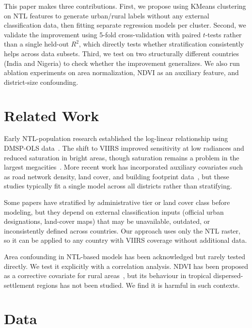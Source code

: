 \documentclass[conference]{IEEEtran}
\begin{document}
This paper makes three contributions. First, we propose using KMeans clustering on NTL features to generate urban/rural labels without any external classification data, then fitting separate regression models per cluster. Second, we validate the improvement using 5-fold cross-validation with paired $t$-tests rather than a single held-out $R^2$, which directly tests whether stratification consistently helps across data subsets. Third, we test on two structurally different countries (India and Nigeria) to check whether the improvement generalizes. We also run ablation experiments on area normalization, NDVI as an auxiliary feature, and district-size confounding.

\section{Related Work}

Early NTL-population research established the log-linear relationship using DMSP-OLS data~\cite{elvidge1997,lo2001}. The shift to VIIRS improved sensitivity at low radiances and reduced saturation in bright areas, though saturation remains a problem in the largest megacities~\cite{elvidge2021}. More recent work has incorporated auxiliary covariates such as road network density, land cover, and building footprint data~\cite{stevens2015}, but these studies typically fit a single model across all districts rather than stratifying.

Some papers have stratified by administrative tier or land cover class before modeling, but they depend on external classification inputs (official urban designations, land-cover maps) that may be unavailable, outdated, or inconsistently defined across countries. Our approach uses only the NTL raster, so it can be applied to any country with VIIRS coverage without additional data.

Area confounding in NTL-based models has been acknowledged but rarely tested directly. We test it explicitly with a correlation analysis. NDVI has been proposed as a corrective covariate for rural areas~\cite{zhang2013}, but its behaviour in tropical dispersed-settlement regions has not been studied. We find it is harmful in such contexts.

\section{Data}
\end{document}
